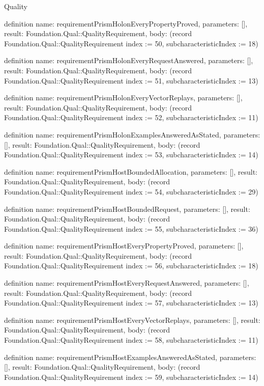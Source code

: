 \begin{lexlean}{Quality}
\begin{semanticmodule}
definition{
  name: requirementPrismHolonEveryPropertyProved,
  parameters: [],
  result: Foundation.Qual::QualityRequirement,
  body: (record Foundation.Qual::QualityRequirement {index := 50, subcharacteristicIndex := 18})
}

definition{
  name: requirementPrismHolonEveryRequestAnswered,
  parameters: [],
  result: Foundation.Qual::QualityRequirement,
  body: (record Foundation.Qual::QualityRequirement {index := 51, subcharacteristicIndex := 13})
}

definition{
  name: requirementPrismHolonEveryVectorReplays,
  parameters: [],
  result: Foundation.Qual::QualityRequirement,
  body: (record Foundation.Qual::QualityRequirement {index := 52, subcharacteristicIndex := 11})
}

definition{
  name: requirementPrismHolonExamplesAnsweredAsStated,
  parameters: [],
  result: Foundation.Qual::QualityRequirement,
  body: (record Foundation.Qual::QualityRequirement {index := 53, subcharacteristicIndex := 14})
}

definition{
  name: requirementPrismHostBoundedAllocation,
  parameters: [],
  result: Foundation.Qual::QualityRequirement,
  body: (record Foundation.Qual::QualityRequirement {index := 54, subcharacteristicIndex := 29})
}

definition{
  name: requirementPrismHostBoundedRequest,
  parameters: [],
  result: Foundation.Qual::QualityRequirement,
  body: (record Foundation.Qual::QualityRequirement {index := 55, subcharacteristicIndex := 36})
}

definition{
  name: requirementPrismHostEveryPropertyProved,
  parameters: [],
  result: Foundation.Qual::QualityRequirement,
  body: (record Foundation.Qual::QualityRequirement {index := 56, subcharacteristicIndex := 18})
}

definition{
  name: requirementPrismHostEveryRequestAnswered,
  parameters: [],
  result: Foundation.Qual::QualityRequirement,
  body: (record Foundation.Qual::QualityRequirement {index := 57, subcharacteristicIndex := 13})
}

definition{
  name: requirementPrismHostEveryVectorReplays,
  parameters: [],
  result: Foundation.Qual::QualityRequirement,
  body: (record Foundation.Qual::QualityRequirement {index := 58, subcharacteristicIndex := 11})
}

definition{
  name: requirementPrismHostExamplesAnsweredAsStated,
  parameters: [],
  result: Foundation.Qual::QualityRequirement,
  body: (record Foundation.Qual::QualityRequirement {index := 59, subcharacteristicIndex := 14})
}


\end{semanticmodule}
\end{lexlean}
